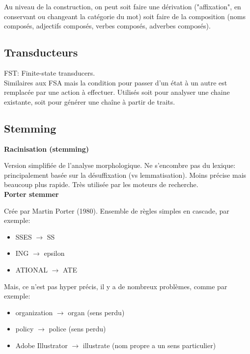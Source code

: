 Au niveau de la construction, on peut soit faire une dérivation ("affixation", en conservant ou changeant la catégorie du mot) soit faire de la composition (noms composés, adjectifs composés, verbes composés, adverbes composés). \\

\subsection{Transducteurs}

FST: Finite-state transducers.\\

Similaires aux FSA mais la condition pour passer d'un état à un autre est remplacée par une action à effectuer. Utilisés soit pour analyser une chaine existante, soit pour générer une chaîne à partir de traits.\\

\subsection{Stemming}

\textbf{Racinisation (stemming)}

Version simplifiée de l'analyse morphologique. Ne s'encombre pas du lexique: principalement basée sur la désuffixation (vs lemmatisation). Moins précise mais beaucoup plus rapide. Très utilisée par les moteurs de recherche.\\

\textbf{Porter stemmer}

Crée par Martin Porter (1980). Ensemble de règles simples en cascade, par exemple:

\begin{itemize}
    \item SSES $\rightarrow$ SS
    \item ING $\rightarrow$ epsilon
    \item ATIONAL $\rightarrow$ ATE\\
\end{itemize}

Mais, ce n'est pas hyper précis, il y a de nombreux problèmes, comme par exemple:

\begin{itemize}
    \item organization $\rightarrow$ organ (sens perdu)
    \item policy $\rightarrow$ police (sens perdu)
    \item Adobe Illustrator $\rightarrow$ illustrate (nom propre a un sens particulier)\\
\end{itemize}

